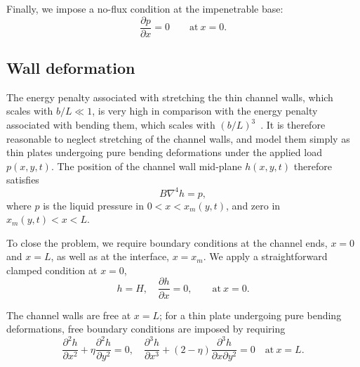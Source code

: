 \documentclass{jfm}
\newcommand{\ddp}[2]{\frac{\partial #1}{\partial #2}}
\newcommand{\poisson}{\eta} %
\begin{document}
Finally, we impose a no-flux condition at the impenetrable base:
\begin{equation}\label{E:Model:Liquid:nofluxBC}
\ddp{p}{x}=0 \qquad \text{at}~x =0.
\end{equation}

\subsection{Wall deformation}
The energy penalty associated with stretching the thin channel walls, which scales with $b/L \ll 1$, is very high in comparison with the energy penalty associated with bending them, which scales with $(b/L)^3$~\citep{Pini2016SciRep}. It is therefore reasonable to neglect stretching of the channel walls, and model them simply as thin plates undergoing pure bending deformations under the applied load $p(x,y,t)$. The position of the channel wall mid-plane $h(x,y,t)$ therefore satisfies~\citep{Timoshenko1959}
\begin{equation}\label{E:Model:Wall:Bilaplacian}
B\nabla^4 h = p,
\end{equation}
where $p$ is the liquid pressure in $0 < x < x_m(y,t)$, and zero in $x_m(y,t) < x < L$. 

To close the problem, we require boundary conditions at the channel ends, $x= 0$ and $x = L$, as well as at the interface, $x = x_m$. We apply a straightforward clamped condition at $x = 0$,
\begin{equation}\label{E:Model:Wall:ClampedBC}
h= H, \quad \ddp{h}{x} = 0, \qquad \text{at}~x = 0.
\end{equation}

The channel walls are free at $x = L$; for a thin plate undergoing pure bending deformations, free boundary conditions are imposed by requiring~\citep{Timoshenko1959}
\begin{equation}\label{E:Model:Wall:FreeEndBC}
\ddp{^2 h}{x^2} + \poisson \ddp{^2 h}{y^2} =0, \quad  \ddp{^3 h}{x^3} + (2-\poisson) \ddp{^3 h}{x \partial y^2} = 0\quad \text{at}~x = L.
\end{equation}
\end{document}
